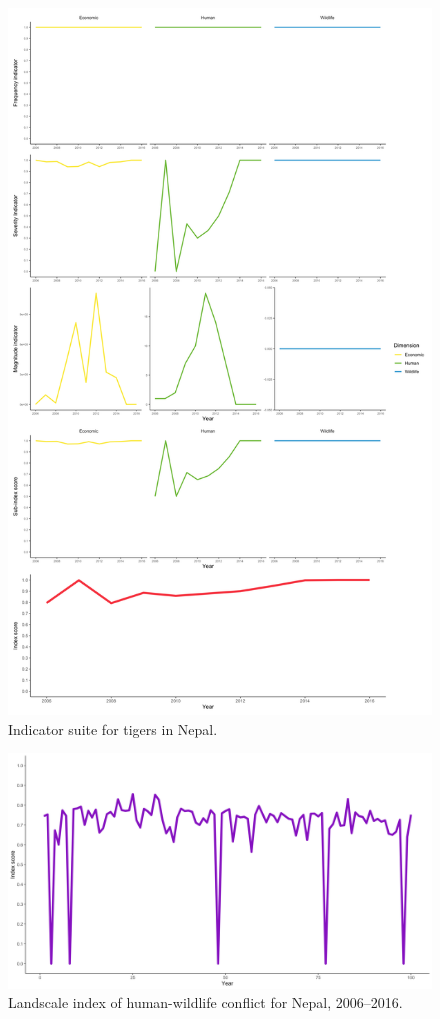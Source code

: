 \documentclass[fleqn,10pt]{olplainarticle}
\begin{document}
\begin{figure}
    \centering
    \includegraphics[width = 1\textwidth]{tiger_all.png}
    \caption{Indicator suite for tigers in Nepal.}
    \label{fig:tiger}
\end{figure}

\begin{figure}
    \centering
    \includegraphics[width = 1\textwidth]{nepal_ix.png}
    \caption{Landscale index of human-wildlife conflict for Nepal, 2006--2016.}
    \label{fig:nepal}
\end{figure}
\end{document}
